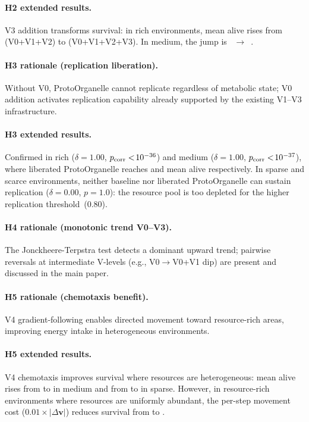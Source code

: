 \documentclass[letterpaper]{article}
\begin{document}
\paragraph{H2 extended results.}
V3 addition transforms survival: in rich environments, mean alive rises from
\aliveVzeroVoneVtwoRich{} (V0+V1+V2) to \aliveVzeroVoneVtwoVthreeRich{}
(V0+V1+V2+V3). In medium, the jump is
\aliveVzeroVoneVtwoMedium{}~$\to$~\aliveVzeroVoneVtwoVthreeMedium{}.

\paragraph{H3 rationale (replication liberation).}
Without V0, ProtoOrganelle cannot replicate regardless of metabolic state;
V0 addition activates replication capability already supported by the
existing V1--V3 infrastructure.

\paragraph{H3 extended results.}
Confirmed in rich ($\delta=1.00$, $p_\text{corr}<\!10^{-36}{}$) and medium
($\delta=1.00$, $p_\text{corr}<\!10^{-37}{}$), where liberated ProtoOrganelle
reaches \aliveProtoLibRich{} and \aliveProtoLibMedium{} mean alive respectively.
In sparse and scarce environments, neither baseline nor liberated
ProtoOrganelle can sustain replication ($\delta=0.00$, $p=1.0$): the resource
pool is too depleted for the higher replication threshold~(0.80).

\paragraph{H4 rationale (monotonic trend V0--V3).}
The Jonckheere-Terpstra test detects a dominant upward trend; pairwise
reversals at intermediate V-levels (e.g., V0$\to$V0+V1 dip) are present
and discussed in the main paper.

\paragraph{H5 rationale (chemotaxis benefit).}
V4 gradient-following enables directed movement toward resource-rich areas,
improving energy intake in heterogeneous environments.

\paragraph{H5 extended results.}
V4 chemotaxis improves survival where resources are heterogeneous:
mean alive rises from \aliveVzeroVoneVtwoVthreeMedium{} to
\aliveVzeroToVfourMedium{} in medium and from \aliveVzeroVoneVtwoVthreeSparse{}
to \aliveVzeroToVfourSparse{} in sparse.
However, in resource-rich environments where resources are uniformly abundant,
the per-step movement cost ($0.01 \times |\Delta\mathbf{v}|$) reduces survival
from \aliveVzeroVoneVtwoVthreeRich{} to \aliveVzeroToVfourRich{}.
\end{document}
